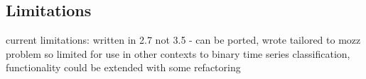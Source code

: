         
    \subsection{Limitations}
    \label{subsec:pl-mozzpy-limit}
        \begin{sitemize}
            \item{current limitations: written in 2.7 not 3.5 - can be ported, wrote tailored to mozz problem so limited for use in other contexts to binary time series classification, functionality could be extended with some refactoring}
        \end{sitemize}

